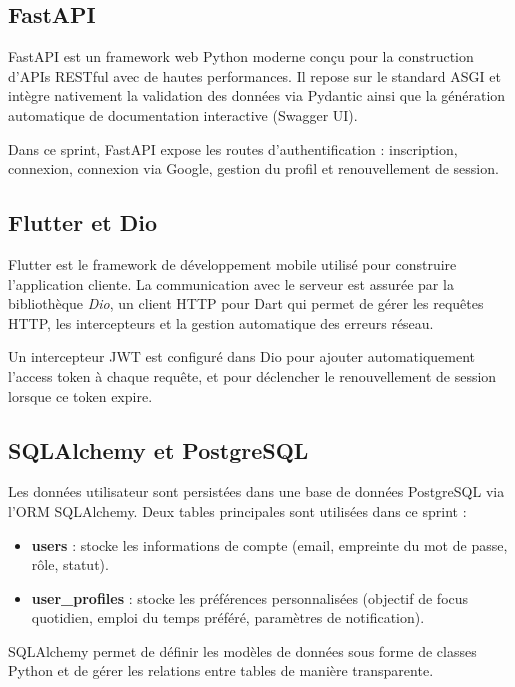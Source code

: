 \subsection{FastAPI}

FastAPI est un framework web Python moderne conçu pour la construction d'APIs RESTful avec de hautes performances. Il repose sur le standard ASGI et intègre nativement la validation des données via Pydantic ainsi que la génération automatique de documentation interactive (Swagger UI).

Dans ce sprint, FastAPI expose les routes d'authentification : inscription, connexion, connexion via Google, gestion du profil et renouvellement de session.

\subsection{Flutter et Dio}

Flutter est le framework de développement mobile utilisé pour construire l'application cliente. La communication avec le serveur est assurée par la bibliothèque \textit{Dio}, un client HTTP pour Dart qui permet de gérer les requêtes HTTP, les intercepteurs et la gestion automatique des erreurs réseau.

Un intercepteur JWT est configuré dans Dio pour ajouter automatiquement l'access token à chaque requête, et pour déclencher le renouvellement de session lorsque ce token expire.

\subsection{SQLAlchemy et PostgreSQL}

Les données utilisateur sont persistées dans une base de données PostgreSQL via l'ORM SQLAlchemy. Deux tables principales sont utilisées dans ce sprint :
\begin{itemize}
    \item \textbf{users} : stocke les informations de compte (email, empreinte du mot de passe, rôle, statut).
    \item \textbf{user\_profiles} : stocke les préférences personnalisées (objectif de focus quotidien, emploi du temps préféré, paramètres de notification).
\end{itemize}

SQLAlchemy permet de définir les modèles de données sous forme de classes Python et de gérer les relations entre tables de manière transparente.


